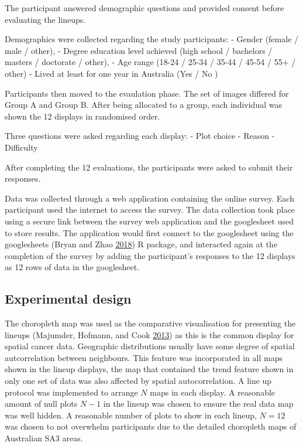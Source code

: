 \documentclass[conference,final,]{IEEEtran}
\begin{document}
The participant answered demographic questions and provided consent
before evaluating the lineups.

Demographics were collected regarding the study participants: - Gender
(female / male / other), - Degree education level achieved (high school
/ bachelors / masters / doctorate / other), - Age range (18-24 / 25-34 /
35-44 / 45-54 / 55+ / other) - Lived at least for one year in Australia
(Yes / No )

Participants then moved to the evaulation phase. The set of images
differed for Group A and Group B. After being allocated to a group, each
individual was shown the 12 displays in randomised order.

Three questions were asked regarding each display: - Plot choice -
Reason - Difficulty

After completing the 12 evaluations, the participants were asked to
submit their responses.

Data was collected through a web application containing the online
survey. Each participant used the internet to access the survey. The
data collection took place using a secure link between the survey web
application and the googlesheet used to store results. The application
would first connect to the googlesheet using the googlesheets (Bryan and
Zhao \protect\hyperlink{ref-sheets}{2018}) R package, and interacted
again at the completion of the survey by adding the participant's
responses to the 12 displays as 12 rows of data in the googlesheet.

\hypertarget{experimental-design}{%
\subsection{Experimental design}\label{experimental-design}}

The choropleth map was used as the comparative visualisation for
presenting the lineups (Majumder, Hofmann, and Cook
\protect\hyperlink{ref-VVSIALM}{2013}) as this is the common display for
spatial cancer data. Geographic distributions usually have some degree
of spatial autcorrelation between neighbours. This feature was
incorporated in all maps shown in the lineup displays, the map that
contained the trend feature shown in only one set of data was also
affected by spatial autocorrelation. A line up protocol was implemented
to arrange \(N\) maps in each display. A reasonable amount of null plots
\(N-1\) in the lineup was chosen to ensure the real data map was well
hidden. A reasonable number of plots to show in each lineup, \(N = 12\)
was chosen to not overwhelm participants due to the detailed choropleth
maps of Australian SA3 areas.
\end{document}
